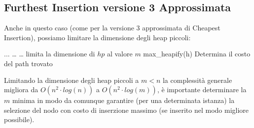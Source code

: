 \documentclass[a4paper,12pt]{report}
\begin{document}
\subsection{Furthest Insertion versione 3 Approssimata}
Anche in questo caso (come per la versione 3 approssimata di Cheapest Insertion), possiamo limitare la dimensione degli heap piccoli:
\begin{tcolorbox}[colframe=black, colback=white, boxrule=0.5pt, title=Furthest Insertion Versione 3, coltitle=black, fonttitle=\bfseries, colbacktitle=white, breakable]
  \begin{algorithmic}[1]
    \State ...
      \State \dots
        \State \dots
      \EndFor
        \State limita la dimensione di $hp$ al valore $m$
      \EndFor
      \State max\_heapify(h)
    \EndWhile
    \State Determina il costo del path trovato
  \end{algorithmic}
\end{tcolorbox}
Limitando la dimensione degli heap piccoli a $m < n$ la complessità generale migliora da $O(n^2 \cdot log(n))$ a $O(n^2 \cdot log(m))$, è importante determinare la $m$ minima in modo da comunque garantire (per una determinata istanza) la selezione del nodo con costo di inserzione massimo (se inserito nel modo migliore possibile).
\end{document}
